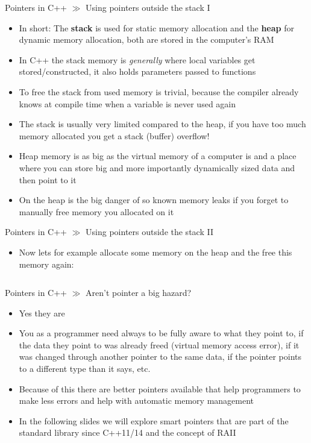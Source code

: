 \documentclass[10pt]{beamer}
\begin{document}
\begin{frame}{Pointers in C++ $\gg$ Using pointers outside the stack I}
\begin{itemize}
	\item In short: The \textbf{stack} is used for static memory allocation and the \textbf{heap} for dynamic memory allocation, both are stored in the computer's RAM
	\item In C++ the stack memory is \textit{generally} where local variables get stored/constructed, it also holds parameters passed to functions
	\item To free the stack from used memory is trivial, because the compiler already knows at compile time when a variable is never used again
	\item The stack is usually very limited compared to the heap, if you have too much memory allocated you get a stack (buffer) overflow!
	\item Heap memory is as big as the virtual memory of a computer is and a place where you can store big and more importantly dynamically sized data and then point to it
	\item On the heap is the big danger of so known memory leaks if you forget to manually free memory you allocated on it
\end{itemize}
\end{frame}

\begin{frame}{Pointers in C++ $\gg$ Using pointers outside the stack II}
\begin{itemize}
	\item Now lets for example allocate some memory on the heap and the free this memory again:
	\inputminted[bgcolor=lightGreyCustom,fontsize=\scriptsize]{cpp}{./resources/heap_ptr.cpp}
\end{itemize}
\end{frame}

\begin{frame}{Pointers in C++ $\gg$ Aren't pointer a big hazard?}
\begin{itemize}
	\item Yes they are
	\item You as a programmer need always to be fully aware to what they point to, if the data they point to was already freed (virtual memory access error), if it was changed through another pointer to the same data, if the pointer points to a different type than it says, etc.
	\item Because of this there are better pointers available that help programmers to make less errors and help with automatic memory management
	\item In the following slides we will explore smart pointers that are part of the standard library since C++11/14 and the concept of RAII
\end{itemize}
\end{frame}
\end{document}
